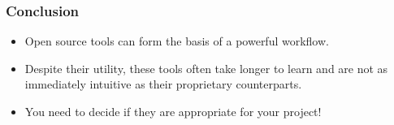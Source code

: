 \documentclass{beamer}
\begin{document}
\begin{frame}[<+->]
	\frametitle{Conclusion}
	\begin{itemize}
		\item Open source tools can form the basis of a powerful workflow.

		      \vfill

		\item Despite their utility, these tools often take longer to learn and are not as immediately intuitive as their proprietary counterparts.

		      \vfill

		\item You need to decide if they are appropriate for your project!

		      \vfill
	\end{itemize}
\end{frame}

\begin{frame}[allowframebreaks]
	\printbibliography%
\end{frame}

\begin{frame}
	\begin{center}
		\hypersetup{%
			urlcolor=black,
		}
	\end{center}
\end{frame}
\end{document}
